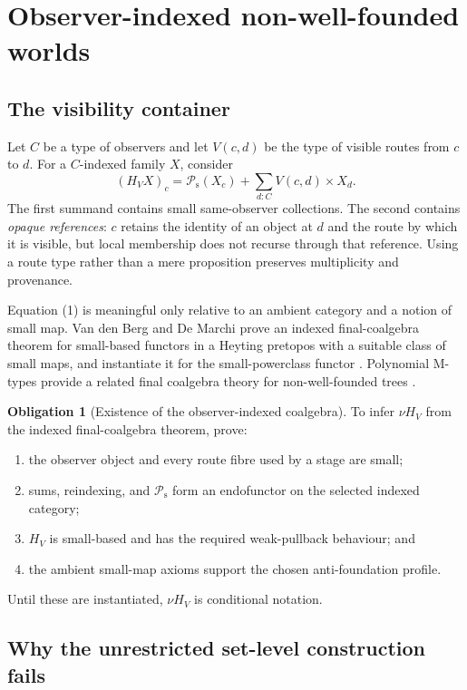 \documentclass[11pt]{article}
\theoremstyle{definition}
\newtheorem{obligation}[theorem]{Obligation}
\theoremstyle{remark}
\newcommand{\Ps}{\mathcal{P}_{\mathrm{s}}}
\begin{document}
\section{Observer-indexed non-well-founded worlds}

\subsection{The visibility container}

Let $C$ be a type of observers and let $V(c,d)$ be the type of visible routes from
$c$ to $d$.  For a $C$-indexed family $X$, consider
\[
  (H_V X)_c
  = \Ps(X_c) + \sum_{d:C} V(c,d)\times X_d.                 \tag{1}
\]
The first summand contains small same-observer collections.  The second contains
\emph{opaque references}: $c$ retains the identity of an object at $d$ and the
route by which it is visible, but local membership does not recurse through that
reference.  Using a route type rather than a mere proposition preserves
multiplicity and provenance.

Equation (1) is meaningful only relative to an ambient category and a notion of
small map.  Van den Berg and De Marchi prove an indexed final-coalgebra theorem
for small-based functors in a Heyting pretopos with a suitable class of small maps,
and instantiate it for the small-powerclass functor
\cite{VanDenBergDeMarchiFinal}.  Polynomial M-types provide a related final
coalgebra theory for non-well-founded trees \cite{VanDenBergDeMarchiMTypes}.

\begin{obligation}[Existence of the observer-indexed coalgebra]
To infer $\nu H_V$ from the indexed final-coalgebra theorem, prove:
\begin{enumerate}[label=(\roman*)]
\item the observer object and every route fibre used by a stage are small;
\item sums, reindexing, and $\Ps$ form an endofunctor on the selected indexed
  category;
\item $H_V$ is small-based and has the required weak-pullback behaviour; and
\item the ambient small-map axioms support the chosen anti-foundation profile.
\end{enumerate}
Until these are instantiated, $\nu H_V$ is conditional notation.
\end{obligation}

\subsection{Why the unrestricted set-level construction fails}
\end{document}

